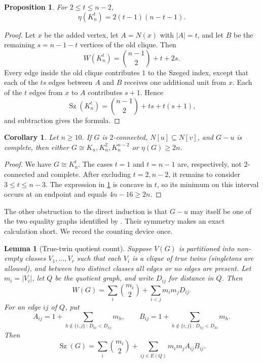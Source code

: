 \documentclass[11pt,reqno]{amsart}
\newtheorem{lemma}[lemma]{Lemma}
\newtheorem{proposition}[proposition]{Proposition}
\newtheorem{corollary}[corollary]{Corollary}
\theoremstyle{definition}
\theoremstyle{remark}
\newcommand{\Sz}{\operatorname{Sz}}
\begin{document}
\begin{proposition}\label{prop:knt}
For $2\le t\le n-2$,
\[
  \eta(K_n^t)=2(t-1)(n-t-1).
\]
\end{proposition}

\begin{proof}
Let $x$ be the added vertex, let $A=N(x)$ with $|A|=t$, and let
$B$ be the remaining $s=n-1-t$ vertices of the old clique.  Then
\[
 W(K_n^t)=\binom{n-1}{2}+t+2s.
\]
Every edge inside the old clique contributes $1$ to the Szeged index, except
that each of the $ts$ edges between $A$ and $B$ receives one additional unit
from $x$.  Each of the $t$ edges from $x$ to $A$ contributes $s+1$.  Hence
\[
 \Sz(K_n^t)=\binom{n-1}{2}+ts+t(s+1),
\]
and subtraction gives the formula.
\end{proof}

\begin{corollary}\label{cor:complete-deletion}
Let $n\ge10$.  If $G$ is $2$-connected, $N[u]\subseteq N[v]$, and $G-u$ is
complete, then either $G\cong K_n,K_n^2,K_n^{n-2}$ or $\eta(G)\ge2n$.
\end{corollary}

\begin{proof}
We have $G\cong K_n^t$.  The cases $t=1$ and $t=n-1$ are, respectively,
not $2$-connected and complete.  After excluding $t=2,n-2$, it remains to
consider $3\le t\le n-3$.  The expression in \cref{prop:knt} is concave in
$t$, so its minimum on this interval occurs at an endpoint and equals
$4n-16\ge2n$.
\end{proof}

The other obstruction to the direct induction is that $G-u$ may itself be one
of the two equality graphs identified by \cite[Theorem~4 and Lemma~11]{BKLPS}.
Their symmetry makes an exact calculation short.  We record the counting device once.

\begin{lemma}[True-twin quotient count]\label{lem:twin}
Suppose $V(G)$ is partitioned into non-empty classes
$V_1,\dots,V_r$ such that each $V_i$ is a clique of true twins (singletons are
allowed), and between two distinct classes all edges or no edges are present.
Let $m_i=|V_i|$, let $Q$ be the quotient graph, and write $D_{ij}$ for distance
in $Q$.  Then
\[
 W(G)=\sum_i\binom{m_i}{2}+\sum_{i<j}m_im_jD_{ij}.
\]
For an edge $ij$ of $Q$, put
\[
 A_{ij}=1+\sum_{h\notin\{i,j\}\,:\,D_{hi}<D_{hj}}m_h,
 \qquad
 B_{ij}=1+\sum_{h\notin\{i,j\}\,:\,D_{hj}<D_{hi}}m_h.
\]
Then
\[
 \Sz(G)=\sum_i\binom{m_i}{2}
       +\sum_{ij\in E(Q)}m_im_jA_{ij}B_{ij}.
\]
\end{lemma}
\end{document}
